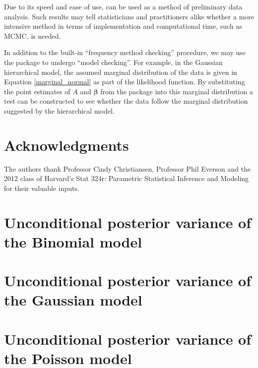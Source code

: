 \documentclass[article]{jss}
\begin{document}
Due to its speed and ease of use,  can be used as a method of preliminary data analysis. Such results may tell statisticians and practitioners alike whether a more intensive method in terms of implementation and computational time, such as MCMC, is needed. 


In addition to the built-in ``frequency method checking'' procedure, we may use the package to undergo ``model checking''. For example, in the Gaussian hierarchical model, the assumed marginal distribution of the data is given in Equation \ref{marginal_normal} as part of the likelihood function. By substituting the point estimates of $A$ and $\boldsymbol{\beta}$ from the package into this marginal distribution a test can be constructed to see whether the data follow the marginal distribution suggested by the hierarchical model.


\section[acknowledgments]{Acknowledgments}
The authors thank Professor Cindy Christiansen, Professor Phil Everson and the 2012 class of Harvard's Stat 324r: Parametric Statistical Inference and Modeling for their valuable inputs.

\appendix
\section{Unconditional posterior variance of the Binomial model}\label{apppostvar}
\section{Unconditional posterior variance of the Gaussian model}\label{apppostvar_normal}

\section{Unconditional posterior variance of the Poisson model}\label{apppostvar_poisson}


\end{document}
